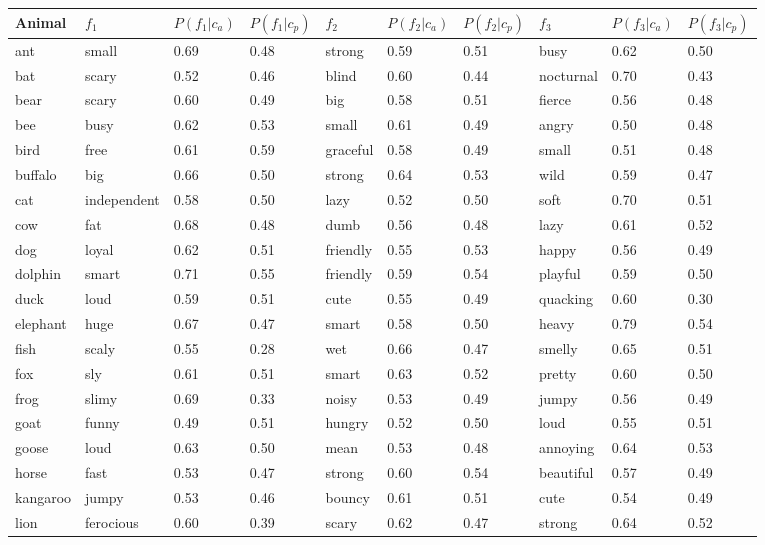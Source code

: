 \documentclass[10pt,letterpaper]{article}
\begin{document}
\begin{table}[t]
\tabcolsep=0.15cm
\small
\begin{tabular}{l lllllllll}

\toprule
Animal & $f_1$ & $P(f_1 | c_a)$ & $P(f_1 | c_p)$ & $f_2$ & $P(f_2 | c_a)$ & $P(f_2 | c_p)$ & $f_3$ & $P(f_3 | c_a)$ & $P(f_3 | c_p)$ \\
\midrule
ant & small & 0.69 & 0.48 & strong & 0.59 & 0.51 & busy & 0.62 & 0.50 \\
bat & scary & 0.52 & 0.46 & blind & 0.60 & 0.44 & nocturnal & 0.70 & 0.43 \\
bear & scary & 0.60 & 0.49 & big & 0.58 & 0.51 & fierce & 0.56 & 0.48 \\
bee & busy & 0.62 & 0.53 & small & 0.61 & 0.49 & angry & 0.50 & 0.48 \\
bird & free & 0.61 & 0.59 & graceful & 0.58 & 0.49 & small & 0.51 & 0.48 \\
buffalo & big & 0.66 & 0.50 & strong & 0.64 & 0.53 & wild & 0.59 & 0.47 \\
cat & independent & 0.58 & 0.50 & lazy & 0.52 & 0.50 & soft & 0.70 & 0.51 \\
cow & fat & 0.68 & 0.48 & dumb & 0.56 & 0.48 & lazy & 0.61 & 0.52 \\
dog & loyal & 0.62 & 0.51 & friendly & 0.55 & 0.53 & happy & 0.56 & 0.49 \\
dolphin & smart & 0.71 & 0.55 & friendly & 0.59 & 0.54 & playful & 0.59 & 0.50 \\
duck & loud & 0.59 & 0.51 & cute & 0.55 & 0.49 & quacking & 0.60 & 0.30 \\
elephant & huge & 0.67 & 0.47 & smart & 0.58 & 0.50 & heavy & 0.79 & 0.54 \\
fish & scaly & 0.55 & 0.28 & wet & 0.66 & 0.47 & smelly & 0.65 & 0.51 \\
fox & sly & 0.61 & 0.51 & smart & 0.63 & 0.52 & pretty & 0.60 & 0.50 \\
frog & slimy & 0.69 & 0.33 & noisy & 0.53 & 0.49 & jumpy & 0.56 & 0.49 \\
goat & funny & 0.49 & 0.51 & hungry & 0.52 & 0.50 & loud & 0.55 & 0.51 \\
goose & loud & 0.63 & 0.50 & mean & 0.53 & 0.48 & annoying & 0.64 & 0.53 \\
horse & fast & 0.53 & 0.47 & strong & 0.60 & 0.54 & beautiful & 0.57 & 0.49 \\
kangaroo & jumpy & 0.53 & 0.46 & bouncy & 0.61 & 0.51 & cute & 0.54 & 0.49 \\
lion & ferocious & 0.60 & 0.39 & scary & 0.62 & 0.47 & strong & 0.64 & 0.52 \\

\end{tabular}
\end{table}
\end{document}
